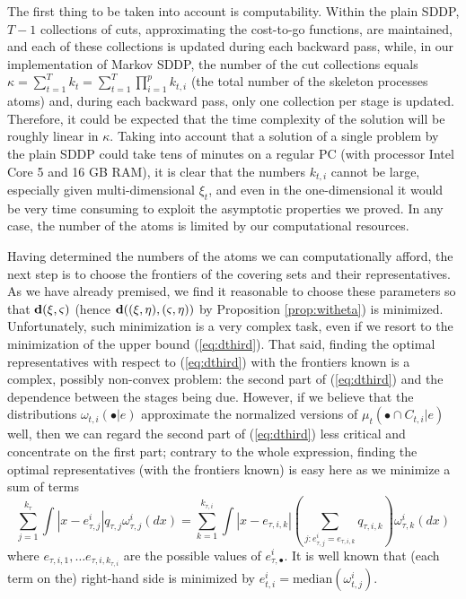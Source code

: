 \documentclass{article}              %
\begin{document}
The first thing to be taken into account is computability. Within the plain SDDP, $T-1$ collections of cuts, approximating
the cost-to-go functions, are maintained, and each of these collections
is updated during each backward pass, while, in our implementation of Markov SDDP, the number
of the cut collections equals $\kappa=\sum_{t=1}^{T}k_{t}=\sum_{t=1}^{T}\prod_{i=1}^{p}k_{t,i}$
(the total number of the skeleton processes atoms) and, during each
backward pass, only one collection per stage is updated. Therefore,
it could be expected that the time complexity of the solution will
be roughly linear in $\kappa$. Taking into account that a solution of a single problem by the plain
SDDP could take tens of minutes on a regular PC (with processor Intel Core 5 and 16 GB RAM), it is clear that the numbers $k_{t,i}$ cannot be
large, especially given multi-dimensional $\xi_{t}$, and even
in the one-dimensional it would be very time consuming to exploit the
asymptotic properties we proved. In any case, the number of the atoms
is limited by our computational resources.

Having determined the numbers of the atoms we can computationally afford, the next step is to choose the
frontiers of the covering sets and their representatives. As we have
already premised, we find it reasonable to choose these parameters so
that $\mathbf{d}(\xi,\varsigma)$ (hence $\mathbf{d}((\xi,\eta),(\varsigma,\eta))$
by Proposition \ref{prop:witheta}) is minimized. 
Unfortunately, such minimization is a very complex task, even if we resort to the minimization of the upper bound (\ref{eq:dthird}).
That said, finding the optimal representatives with respect to (\ref{eq:dthird})
with the frontiers known is a complex, possibly non-convex problem:
the second part of (\ref{eq:dthird}) and the dependence between
the stages being due. However, if we believe that the distributions
$\omega_{t,i}(\bullet|e)$ approximate the normalized versions of
$\mu_{t}(\bullet\cap C_{t,i}|e)$ well, then we can regard the second part of (\ref{eq:dthird}) less critical and concentrate on the
first part; contrary to the whole expression, finding the optimal
representatives (with the frontiers known) is easy here as we minimize a sum of terms 
$$
\sum_{j=1}^{k_{\tau}}\int|x-e_{\tau,j}^{i}|q_{\tau,j}\omega^i_{\tau,j}(dx)
=
\sum_{k=1}^{k_{\tau,i}} \int|x-e_{\tau,i,k}| \left(\sum_{j:e^i_{\tau,j}=e_{\tau,i,k}} q_{\tau,i,k} \right)
\omega^i_{\tau,k} (dx)
$$
where $e_{\tau,i,1},\dots e_{\tau,i,k_{\tau,i}}$ are the possible values of $e^i_{\tau,\bullet}$. It is well known that (each term on the) right-hand side is minimized by $e_{t,i}^{i}=\mathrm{median}(\omega^i_{t,j})$.
\end{document}
